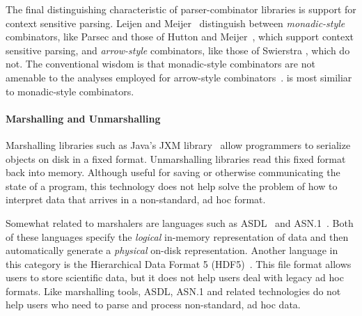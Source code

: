 The final distinguishing characteristic of parser-combinator libraries is support for context sensitive parsing. Leijen and Meijer~\cite{leijen+:parsec} distinguish between \textit{monadic-style} combinators, like Parsec and those of Hutton and Meijer~\cite{hutton+:monadic-parsing}, which support context sensitive parsing, and \textit{arrow-style} combinators, like those of Swierstra \etal{}, which do not. The conventional wisdom is that monadic-style combinators are not amenable to the analyses employed for arrow-style combinators~\cite{leijen+:parsec,swierstra+:deterministic-error-correcting}. \ddc{} is most similiar to monadic-style combinators.


\paragraph*{Marshalling and Unmarshalling}

Marshalling libraries such as Java's JXM library~\cite{jxm} 
allow programmers to
 serialize objects on disk in a fixed format.
Unmarshalling libraries read this fixed format back 
into memory.  Although useful for saving or otherwise communicating 
the state of a program, 
this technology does not help solve the problem of how to interpret
data that arrives in a non-standard, ad hoc format.

Somewhat related to marshalers are languages such as
\textsc{ASDL}~\cite{asdl} and \textsc{ASN.1}~\cite{asn}.  Both of
these languages specify the {\em logical\/} in-memory representation of
data and then automatically generate a {\em physical\/} on-disk
representation.  Another language in this category is the Hierarchical Data
Format 5 (HDF5)~\cite{hdf5}.  This file format allows users to store
scientific data, but it does not help users deal with legacy ad hoc
formats.  Like marshalling tools, ASDL, ASN.1 and related technologies
do not help users who need to parse and process non-standard, ad hoc data.


